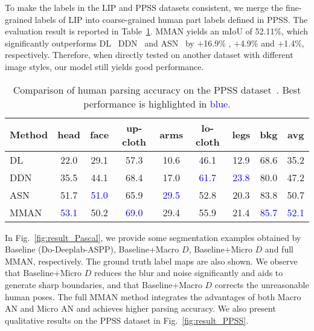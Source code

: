 \documentclass[runningheads]{llncs}
\begin{document}
To make the labels in the LIP and PPSS datasets consistent, we merge the fine-grained labels of LIP into coarse-grained human part labels defined in PPSS. The evaluation result is reported in Table~\ref{tab:PPSS}. MMAN yields an mIoU of 52.11\%, which significantly outperforms DL~\cite{luo2013pedestrian} DDN~\cite{luo2013pedestrian} and ASN~\cite{luc2016semantic} by +16.9\% , +4.9\% and +1.4\%, respectively. Therefore, when directly tested on another dataset with different image styles, our model still yields good performance.

\begin{table}[t]
\centering
\scriptsize
\tabcolsep 0.12in
\caption{Comparison of human parsing accuracy on the PPSS dataset~\cite{luo2013pedestrian}. Best performance is highlighted in \textcolor{blue}{blue}.}
\label{tab:PPSS}
\begin{tabular}{l|cccccccc}
\toprule[0.7pt]
Method                          &   head    &   face    &   up-cloth    &   arms    &   lo-cloth    &   legs    &   bkg     &   avg \\
\hline
DL~\cite{luo2013pedestrian}     &   22.0    &   29.1    &   57.3        &   10.6    &   46.1        &   12.9    &   68.6    &   35.2    \\
DDN~\cite{luo2013pedestrian}    &   35.5	&   44.1    &   68.4        &   17.0    &   \textcolor{blue}{61.7}  &   \textcolor{blue}{23.8}  &   80.0    &   47.2    \\
ASN~\cite{luc2016semantic}      &   51.7    &   \textcolor{blue}{51.0}  &   65.9    &   \textcolor{blue}{29.5}  &   52.8    &   20.3    &   83.8    &   50.7    \\
MMAN							&   \textcolor{blue}{53.1}  &   50.2    &   \textcolor{blue}{69.0}  &   29.4    &   55.9    &   21.4    &   \textcolor{blue}{85.7}  &   \textcolor{blue}{52.1}  \\

\bottomrule[0.7pt]
\end{tabular}
\end{table}

In Fig.~\ref{fig:result_Pascal}, we provide some segmentation examples obtained by Baseline (Do-Deeplab-ASPP), Baseline+Macro $D$, Baseline+Micro $D$ and full MMAN, respectively. The ground truth label maps are also shown.
We observe that Baseline+Micro $D$ reduces the blur and noise significantly and aids to generate sharp boundaries, and that Baseline+Macro $D$ corrects the unreasonable human poses. The full MMAN method integrates the advantages of both Macro AN and Micro AN and achieves higher parsing accuracy. We also present qualitative results on the PPSS dataset in Fig.~\ref{fig:result_PPSS}.
\end{document}
